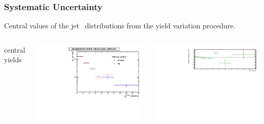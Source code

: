 \documentclass[xcolor={usenames,dvipsnames}]{beamer}
\begin{document}
\begin{frame}
\frametitle{Systematic Uncertainty}

Central values of the jet \pt\ distributions from the yield variation procedure.
\vspace{2pt}
\begin{columns}[c] 

\column{5.5cm} 
\footnotesize{central yields}
\begin{minipage}{1.\linewidth}
\includegraphics[width=0.95\linewidth]{img/rawYieldpPb/jetPtComparison_YieldExtractionCentral.pdf}
\end{minipage}
\begin{minipage}{1.\linewidth}
\includegraphics[width=0.95\linewidth]{img/rawYieldpPb/YieldExtractionRatio.pdf}
\end{minipage}


\end{columns}
\end{frame}
\end{document}
